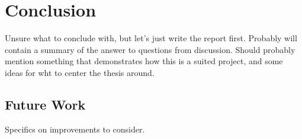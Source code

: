 \chapter{Conclusion}
Unsure what to conclude with, but let's just write the report first. Probably
will contain a summary of the answer to questions from discussion. Should
probably mention something that demonstrates how this is a suited project, and
some ideas for wht to center the thesis around.

\section{Future Work}
Specifics on improvements to consider.